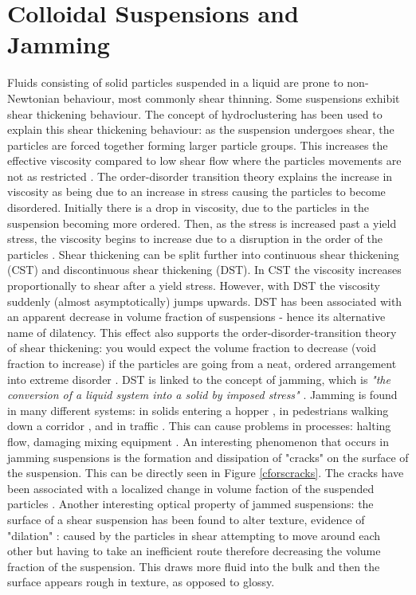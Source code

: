 \documentclass[twoside,a4]{report}
\def\br{\newline \newline \noindent}
\begin{document}
	\section*{Colloidal Suspensions and Jamming}
	Fluids consisting of solid particles suspended in a liquid are prone to non-Newtonian behaviour, most commonly shear thinning. Some suspensions exhibit shear thickening behaviour. The concept of hydroclustering has been used to explain this shear thickening behaviour: as the suspension undergoes shear, the particles are forced together forming larger particle groups. This increases the effective viscosity compared to low shear flow where the particles movements are not as restricted \cite{figshearthick}. The order-disorder transition  theory explains the increase in viscosity as being due to an increase in stress causing the particles to become disordered. Initially there is a drop in viscosity, due to the particles in the suspension becoming more ordered. Then, as the stress is increased past a yield stress, the viscosity begins to increase due to a disruption in the order of the particles \cite{backbrownjaegrev}. %
	\br
	Shear thickening can be split further into continuous shear thickening (CST) and discontinuous shear thickening (DST). In CST the viscosity increases proportionally to shear after a yield stress. However, with DST the viscosity suddenly (almost asymptotically) jumps upwards. DST has been associated with an apparent decrease in volume fraction of suspensions - hence its alternative name of dilatency. This effect also supports the order-disorder-transition theory of shear thickening: you would expect the volume fraction to decrease (void fraction to increase) if the particles are going from a neat, ordered arrangement into extreme disorder \cite{backbrownjaegrev}. 
	\br
	DST is linked to the concept of jamming, which is \textit{"the conversion of a liquid system into a solid by imposed stress"} \cite{backhawjam}. Jamming is found in many different systems: in solids entering a hopper \cite{back2djam}, in pedestrians walking down a corridor \cite{backpedjam}, and in traffic \cite{backcarjam}. This can cause problems in processes: halting flow, damaging mixing equipment \cite{backshearjambertrand}.
	\br 
	An interesting phenomenon that occurs in jamming suspensions is the formation and dissipation of "cracks" on the surface of the suspension. This can be directly seen in Figure \ref{cforscracks}. The cracks have been associated with a localized change in volume faction of the suspended particles \cite{backhawjam}. Another interesting optical property of jammed suspensions: the surface of a shear suspension has been found to alter texture, evidence of "dilation" \cite{backbrownjaegrev}: caused by the particles in shear attempting to move around each other but having to take an inefficient route therefore decreasing the volume fraction of the suspension. This draws more fluid into the bulk and then the surface appears rough in texture, as opposed to glossy. 
	
\end{document}
